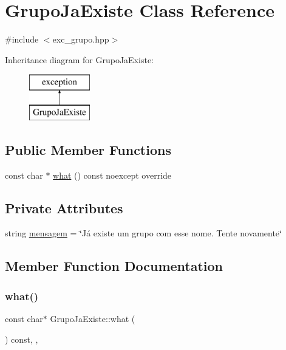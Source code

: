 \hypertarget{classGrupoJaExiste}{}\section{Grupo\+Ja\+Existe Class Reference}
\label{classGrupoJaExiste}


{\ttfamily \#include $<$exc\+\_\+grupo.\+hpp$>$}

Inheritance diagram for Grupo\+Ja\+Existe\+:\begin{figure}[H]
\begin{center}
\leavevmode
\includegraphics[height=2.000000cm]{classGrupoJaExiste}
\end{center}
\end{figure}
\subsection*{Public Member Functions}
\begin{DoxyCompactItemize}
\item 
const char $\ast$ \hyperlink{classGrupoJaExiste_a3a976953ceee43dbcadbf7638209b2c4}{what} () const noexcept override
\end{DoxyCompactItemize}
\subsection*{Private Attributes}
\begin{DoxyCompactItemize}
\item 
string \hyperlink{classGrupoJaExiste_aa2438c23067a525e7e1cdbf773b01dba}{mensagem} = \char`\"{}Já existe um grupo com esse nome. Tente novamente\char`\"{}
\end{DoxyCompactItemize}


\subsection{Member Function Documentation}
\mbox{\label{classGrupoJaExiste_a3a976953ceee43dbcadbf7638209b2c4}} 
\subsubsection{\texorpdfstring{what()}{what()}}
{\footnotesize\ttfamily const char$\ast$ Grupo\+Ja\+Existe\+::what (\begin{DoxyParamCaption}{ }\end{DoxyParamCaption}) const\hspace{0.3cm}{\ttfamily [inline]}, {\ttfamily [override]}, {\ttfamily [noexcept]}}



